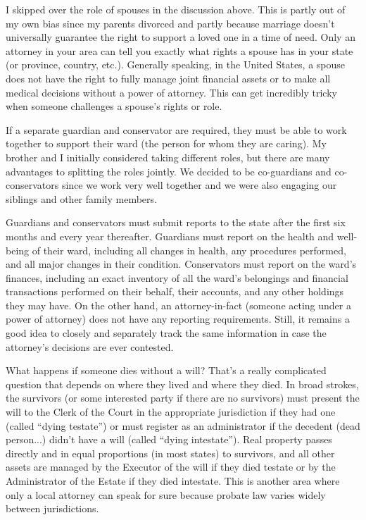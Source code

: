 \documentclass{article}
\begin{document}
I skipped over the role of spouses in the discussion above. This is partly out of my own bias since my parents divorced and partly because marriage doesn't universally guarantee the right to support a loved one in a time of need. Only an attorney in your area can tell you exactly what rights a spouse has in your state (or province, country, etc.). Generally speaking, in the United States, a spouse does not have the right to fully manage joint financial assets or to make all medical decisions without a power of attorney. This can get incredibly tricky when someone challenges a spouse's rights or role.

If a separate guardian and conservator are required, they must be able to work together to support their ward (the person for whom they are caring). My brother and I initially considered taking different roles, but there are many advantages to splitting the roles jointly. We decided to be co-guardians and co-conservators since we work very well together and we were also engaging our siblings and other family members.

Guardians and conservators must submit reports to the state after the first six months and every year thereafter. Guardians must report on the health and well-being of their ward, including all changes in health, any procedures performed, and all major changes in their condition. Conservators must report on the ward's finances, including an exact inventory of all the ward's belongings and financial transactions performed on their behalf, their accounts, and any other holdings they may have. On the other hand, an attorney-in-fact (someone acting under a power of attorney) does not have any reporting requirements. Still, it remains a good idea to closely and separately track the same information in case the attorney's decisions are ever contested.

What happens if someone dies without a will? That's a really complicated question that depends on where they lived and where they died. In broad strokes, the survivors (or some interested party if there are no survivors) must present the will to the Clerk of the Court in the appropriate jurisdiction if they had one (called ``dying testate'') or must register as an administrator if the decedent (dead person...) didn't have a will (called ``dying intestate''). Real property passes directly and in equal proportions (in most states) to survivors, and all other assets are managed by the Executor of the will if they died testate or by the Administrator of the Estate if they died intestate. This is another area where only a local attorney can speak for sure because probate law varies widely between jurisdictions.
\end{document}
